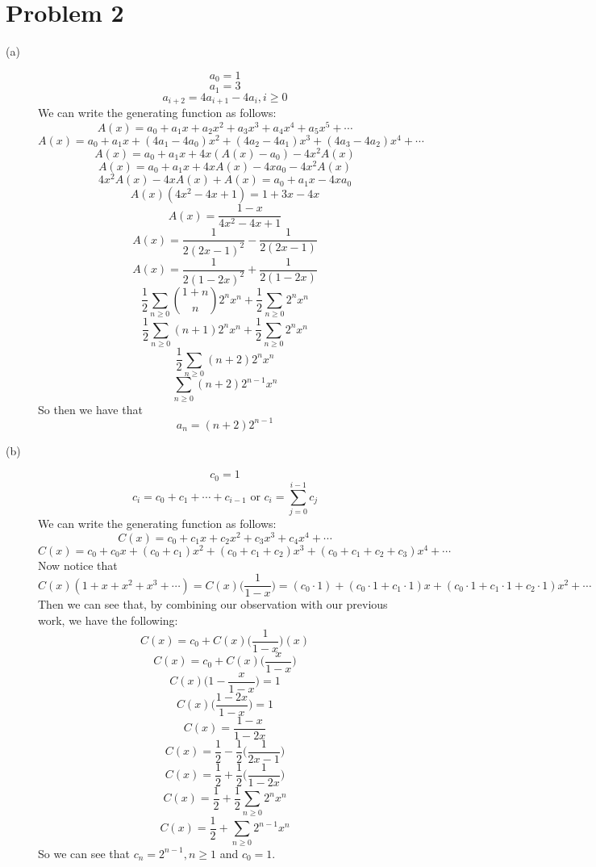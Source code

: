 \documentclass{article}
\begin{document}
\section*{Problem 2}
\begin{description}
    \item[(a)]
        \[ a_0 =1 \]
        \[ a_1 = 3 \]
        \[ a_{i+2} = 4a_{i+1} - 4a_i, i \geq 0 \]
        We can write the generating function as follows:
        \[ A(x) = a_0 + a_1x + a_2x^2 + a_3x^3 + a_4x^4 + a_5x^5 + \cdots \]
        \[ A(x) = a_0 + a_1x + (4a_1 - 4a_0)x^2 + (4a_2 - 4a_1)x^3 +
            (4a_3 - 4a_2)x^4 + \cdots \]
        \[ A(x) = a_0 + a_1x + 4x(A(x) - a_0) - 4x^2A(x) \]
        \[ A(x) = a_0 + a_1x + 4xA(x) - 4xa_0 - 4x^2A(x) \]
        \[ 4x^2A(x) - 4xA(x) + A(x) = a_0 + a_1x - 4xa_0 \]
        \[ A(x)(4x^2 - 4x + 1) = 1 + 3x - 4x \]
        \[ A(x) = \frac{1 - x}{4x^2 - 4x + 1} \]
        \[ A(x) = \frac{1}{2(2x-1)^2} - \frac{1}{2(2x-1)} \]
        \[ A(x) = \frac{1}{2(1-2x)^2} + \frac{1}{2(1-2x)} \]
        \[ \frac{1}{2} \sum_{n \geq 0} \binom{1+n}{n} 2^n x^n
            + \frac{1}{2} \sum_{n \geq 0} 2^n x^n \]
        \[ \frac{1}{2} \sum_{n \geq 0} (n+1) 2^n x^n + \frac{1}{2} \sum_{n \geq 0}
            2^n x^n \]
        \[ \frac{1}{2} \sum_{n \geq 0} (n+2) 2^n x^n \]
        \[ \sum_{n \geq 0} (n+2) 2^{n-1} x^n \]
        So then we have that
        \[ a_n = (n+2)2^{n-1} \]
    \item[(b)]
        \[ c_0 = 1 \]
        \[ c_i = c_0 + c_1 + \cdots + c_{i-1} \text{ or }
                c_i = \sum_{j = 0}^{i - 1} c_j \]
        We can write the generating function as follows:
        \[ C(x) = c_0 + c_1x + c_2x^2 + c_3x^3 + c_4x^4 + \cdots \]
        \[ C(x) = c_0 + c_0x + (c_0 + c_1)x^2 + (c_0 + c_1 + c_2)x^3
            + (c_0 + c_1 + c_2 + c_3)x^4 + \cdots \]
        Now notice that
        \[ C(x)(1 + x + x^2 + x^3 + \cdots) = C(x)\Big(\frac{1}{1-x}\Big) =
            (c_0 \cdot 1) + (c_0 \cdot 1 + c_1 \cdot 1)x + (c_0 \cdot 1
            + c_1 \cdot 1 + c_2 \cdot 1)x^2 + \cdots \]
        Then we can see that, by combining our observation with our previous
        work, we have the following:
        \[ C(x) = c_0 + C(x)\Big(\frac{1}{1-x}\Big)(x) \]
        \[ C(x) = c_0 + C(x)\Big(\frac{x}{1-x}\Big) \]
        \[ C(x)\Big(1 - \frac{x}{1-x}\Big) = 1 \]
        \[ C(x)\Big(\frac{1-2x}{1-x}\Big) = 1 \]
        \[ C(x) = \frac{1-x}{1-2x} \]
        \[ C(x) = \frac{1}{2} - \frac{1}{2}\Big(\frac{1}{2x-1}\Big) \]
        \[ C(x) = \frac{1}{2} + \frac{1}{2}\Big(\frac{1}{1-2x}\Big) \]
        \[ C(x) = \frac{1}{2} + \frac{1}{2} \sum_{n \geq 0} 2^n x^n \]
        \[ C(x) = \frac{1}{2} + \sum_{n \geq 0} 2^{n-1} x^n \]
        So we can see that $c_n = 2^{n-1}, n \geq 1$ and $c_0 = 1$.
\end{description}
\end{document}
